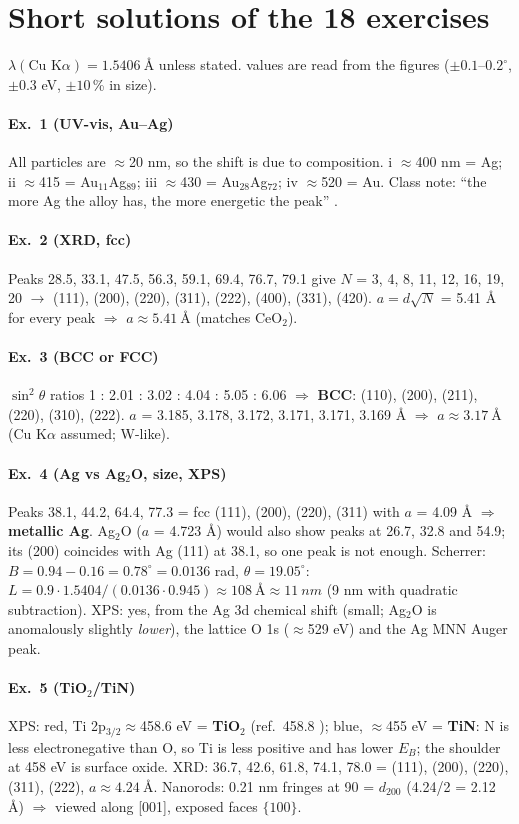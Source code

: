 \section{Short solutions of the 18 exercises}
\label{sec:solutions}
$\lambda(\text{Cu K}\alpha) = \SI{1.5406}{\angstrom}$ unless stated. \readoff{} values are read from the figures ($\pm0.1$--$0.2^\circ$,
$\pm0.3$ eV, $\pm10$\,\% in size).

\newcommand{\ex}[1]{\paragraph{Ex.~#1}}

\ex{1 (UV-vis, Au--Ag)} All particles are $\approx$20 nm, so the shift is due to composition. i $\approx$400 nm = Ag;
ii $\approx$415 = Au$_{11}$Ag$_{89}$; iii $\approx$430 = Au$_{28}$Ag$_{72}$; iv $\approx$520 = Au\readoff. Class note: ``the more Ag the alloy
has, the more energetic the peak'' .

\ex{2 (XRD, fcc)} Peaks 28.5, 33.1, 47.5, 56.3, 59.1, 69.4, 76.7, 79.1\textdegree\readoff{} give $N$ = 3, 4, 8, 11, 12, 16, 19, 20
$\to$ (111), (200), (220), (311), (222), (400), (331), (420). $a = d\sqrt N$ = 5.41 \AA{} for every peak $\Rightarrow$
$\boxed{a\approx\SI{5.41}{\angstrom}}$ (matches CeO$_2$).

\ex{3 (BCC or FCC)} $\sin^2\theta$ ratios 1 : 2.01 : 3.02 : 4.04 : 5.05 : 6.06 $\Rightarrow$ \textbf{BCC}: (110), (200), (211), (220),
(310), (222). $a$ = 3.185, 3.178, 3.172, 3.171, 3.171, 3.169 \AA{} $\Rightarrow$ $\boxed{a\approx\SI{3.17}{\angstrom}}$ (Cu K$\alpha$
assumed; W-like\extra).

\ex{4 (Ag vs Ag$_2$O, size, XPS)} Peaks 38.1, 44.2, 64.4, 77.3\textdegree{} = fcc (111), (200), (220), (311) with
$a$ = 4.09 \AA{} $\Rightarrow$ \textbf{metallic Ag}. Ag$_2$O ($a$ = 4.723 \AA) would also show peaks at 26.7, 32.8 and 54.9\textdegree;
its (200) coincides with Ag (111) at 38.1\textdegree, so one peak is not enough.
Scherrer: $B = 0.94-0.16 = 0.78^\circ = 0.0136$ rad, $\theta = 19.05^\circ$:
$L = 0.9\cdot1.5404/(0.0136\cdot0.945)\approx\SI{108}{\angstrom}\approx\boxed{\SI{11}{nm}}$ (9 nm with quadratic subtraction\extra).
XPS: yes, from the Ag 3d chemical shift (small; Ag$_2$O is anomalously slightly \emph{lower}\extra), the lattice O 1s
($\approx$529 eV\extra) and the Ag MNN Auger peak\extra.

\ex{5 (TiO$_2$/TiN)} XPS: red, Ti 2p$_{3/2}\approx$458.6 eV = \textbf{TiO$_2$} (ref.\ 458.8 ); blue, $\approx$455 eV =
\textbf{TiN}: N is less electronegative than O, so Ti is less positive and has lower $E_B$; the shoulder at 458 eV is surface oxide.
XRD: 36.7, 42.6, 61.8, 74.1, 78.0\textdegree\readoff{} = (111), (200), (220), (311), (222), $\boxed{a\approx\SI{4.24}{\angstrom}}$.
Nanorods: 0.21 nm fringes at 90\textdegree{} = $d_{200}$ (4.24/2 = 2.12 \AA) $\Rightarrow$ viewed along [001], exposed faces
$\boxed{\{100\}}$.

